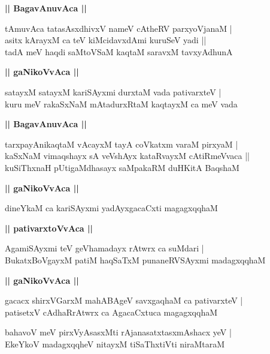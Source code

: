 \documentclass[twoside,12pt,openright]{book}
\newcounter{shloka}[chapter]
\def\uvaca#1{\centerline{{\large\textbf{#1}}}}
\begin{document}
\uvaca{|| BagavAnuvAca ||}

\begin{shloka}%
tAmuvAca tatasAsxdhivxV nameV cAtheRV parxyoVjanaM |\\
asitx kArayxM ca teV kiMcidavxdAmi kuruSeV yadi ||\\
tadA meV haqdi saMtoVSaM kaqtaM saravxM tavxyAdhunA	
\end{shloka}

\uvaca{|| gaNikoVvAca ||}

\begin{shloka}%
satayxM satayxM kariSAyxmi durxtaM vada pativarxteV |\\
kuru  meV rakaSxNaM mAtadurxRtaM kaqtayxM ca meV vada
\end{shloka}

\uvaca{|| BagavAnuvAca ||}

\begin{shloka}%
tarxpayAnikaqtaM vAcayxM tayA coVkatxm varaM pirxyaM |\\
kaSxNaM vimaqshayx sA veVshAyx kataRvayxM cAtiRmeVvaca ||\\
kuSiThxnaH pUtigaMdhasayx saMpakaRM duHKitA BaqshaM 
\end{shloka}

\uvaca{|| gaNikoVvAca ||}

\begin{shloka}%
dineYkaM ca kariSAyxmi yadAyxgacaCxti magagxqqhaM 
\end{shloka}

\uvaca{|| pativarxtoVvAca ||}

\begin{shloka}%
AgamiSAyxmi teV geVhamadayx rAtwrx ca suMdari |\\
BukatxBoVgayxM patiM haqSaTxM punaneRVSAyxmi madagxqqhaM 
\end{shloka}

\uvaca{|| gaNikoVvAca ||}

\begin{shloka}%
gacacx shirxVGarxM mahABAgeV savxgaqhaM ca pativarxteV |\\
patisetxV cAdhaRrAtwrx ca AgacaCxtuca magagxqqhaM 
\end{shloka}

\begin{shloka}%
bahavoV meV pirxVyAsasxMti rAjanasatxtasxmAshacx yeV |\\
EkeYkoV madagxqqheV nitayxM tiSaThxtiVti niraMtaraM 
\end{shloka}
\end{document}
